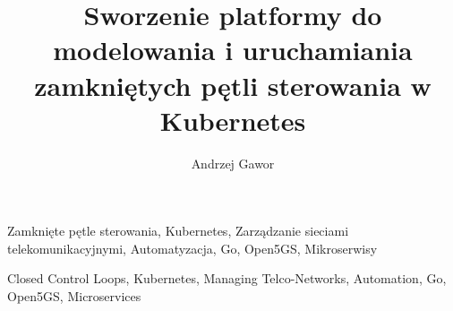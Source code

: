 \documentclass[
    bindingoffset=5mm,  %
    footnoteindent=3mm, %
    hyphenation=true    %
]{src/wut-thesis}
\begin{document}
\title{
    Sworzenie platformy do modelowania i uruchamiania zamkniętych pętli sterowania w Kubernetes
}
\author{Andrzej Gawor}
\date{\the\year}
\maketitle

\cleardoublepage
\abstract

\keywords Zamknięte pętle sterowania, Kubernetes, Zarządzanie sieciami telekomunikacyjnymi, Automatyzacja, Go, Open5GS, Mikroserwisy

\clearpage
\secondabstract

\secondkeywords Closed Control Loops, Kubernetes, Managing Telco-Networks, Automation, Go, Open5GS, Microservices

\pagestyle{plain}

\cleardoublepage
\tableofcontents

\cleardoublepage 
\pagestyle{headings}

 

\cleardoublepage 
\printbibliography



\newpage
\pagestyle{plain}


\listoffigurestoc    
\vspace{1cm}         
\listoftablestoc     
\vspace{1cm}         
\listofappendicestoc 


\end{document}

